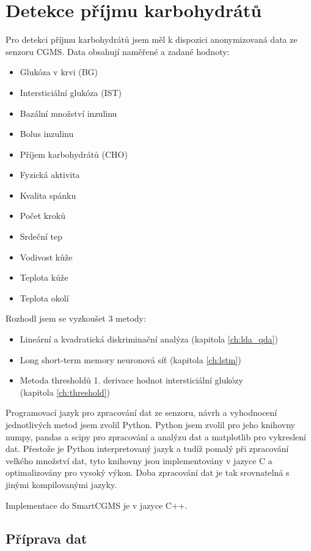 \chapter{Detekce příjmu karbohydrátů}

Pro detekci příjmu karbohydrátů jsem měl k dispozici anonymizovaná data ze senzoru CGMS. Data obsahují naměřené a zadané hodnoty:
\begin{itemize}
\setlength\itemsep{0em}
\item Glukóza v krvi (BG)
\item Intersticiální glukóza (IST)
\item Bazální množství inzulinu
\item Bolus inzulinu
\item Příjem karbohydrátů (CHO)
\item Fyzická aktivita
\item Kvalita spánku
\item Počet kroků
\item Srdeční tep
\item Vodivost kůže
\item Teplota kůže
\item Teplota okolí
\end{itemize}

Rozhodl jsem se vyzkoušet 3 metody:
\begin{itemize}
\setlength\itemsep{0em}
\item Lineární a kvadratická diskriminační analýza (kapitola \ref{ch:lda_qda})
\item Long short-term memory neuronová síť (kapitola \ref{ch:lstm})
\item Metoda thresholdů 1. derivace hodnot intersticiální glukózy \\(kapitola \ref{ch:threshold})
\end{itemize}

Programovací jazyk pro zpracování dat ze senzoru, návrh a vyhodnocení jednotlivých metod jsem zvolil Python. Python jsem zvolil pro jeho knihovny numpy, pandas a scipy pro zpracování a analýzu dat a matplotlib pro vykreslení dat. Přestože je Python interpretovaný jazyk a tudíž pomalý při zpracování velkého množství dat, tyto knihovny jsou implementovány v jazyce C a optimalizovány pro vysoký výkon. Doba zpracování dat je tak srovnatelná s jinými kompilovanými jazyky.

Implementace do SmartCGMS je v jazyce C++.

\newpage

\section{Příprava dat}

